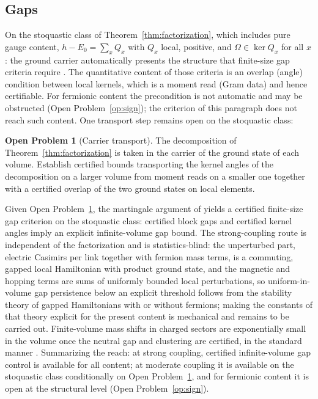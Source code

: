 \documentclass[11pt]{article}
\theoremstyle{definition}
\newtheorem{openproblem}[theorem]{Open Problem}
\theoremstyle{remark}
\begin{document}
\subsection{Gaps}\label{sec:gaps}
On the stoquastic class of Theorem~\ref{thm:factorization}, which
includes pure gauge content, $h - E_0 = \sum_x Q_x$ with $Q_x$ local,
positive, and $\Omega \in \ker Q_x$ for all $x$: the ground carrier
automatically presents the structure that finite-size gap criteria
require \cite{knabe,nachtergaele}.  The quantitative content of those
criteria is an overlap (angle) condition between local kernels, which is
a moment read (Gram data) and hence certifiable.  For fermionic
content the precondition is not automatic and may be obstructed (Open
Problem~\ref{op:sign}); the criterion of this paragraph does not reach
such content.  One transport step remains open on the stoquastic class:

\begin{openproblem}[Carrier transport]\label{op:carrier}
The decomposition of Theorem~\ref{thm:factorization} is taken in the
carrier of the ground state of each volume.  Establish certified bounds
transporting the kernel angles of the decomposition on a larger volume
from moment reads on a smaller one together with a certified overlap of
the two ground states on local elements.
\end{openproblem}

\noindent Given Open Problem~\ref{op:carrier}, the martingale argument
of \cite{nachtergaele} yields a certified finite-size gap criterion on
the stoquastic class: certified block gaps and certified kernel angles
imply an explicit infinite-volume gap bound.  The strong-coupling route
is independent of the factorization and is statistics-blind: the
unperturbed part, electric Casimirs per link together with fermion mass
terms, is a commuting, gapped local Hamiltonian with product ground
state, and the magnetic and hopping terms are sums of uniformly bounded
local perturbations, so uniform-in-volume gap persistence below an
explicit threshold follows from the stability theory of gapped
Hamiltonians \cite{bhm} with or without fermions; making the constants
of that theory explicit for the present content is mechanical and
remains to be carried out.  Finite-volume mass shifts in charged sectors
are exponentially small in the volume once the neutral gap and
clustering are certified, in the standard manner \cite{luscher}.
Summarizing the reach: at strong coupling, certified infinite-volume gap
control is available for all content; at moderate coupling it is
available on the stoquastic class conditionally on Open
Problem~\ref{op:carrier}, and for fermionic content it is open at the
structural level (Open Problem~\ref{op:sign}).
\end{document}

